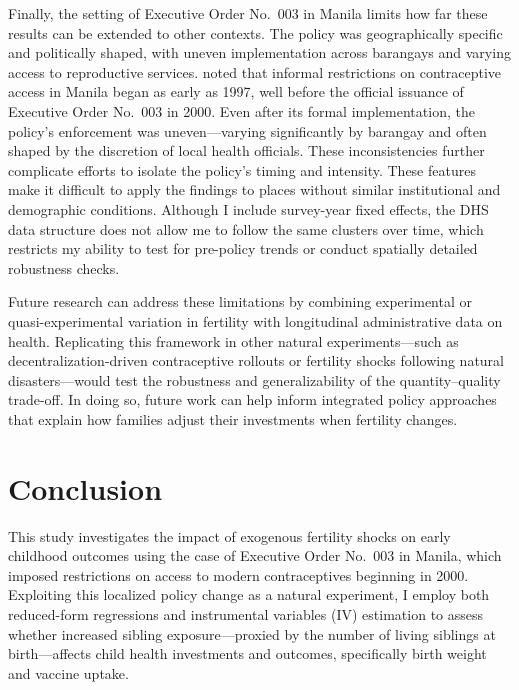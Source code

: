 \documentclass[]{AEA}
\begin{document}
Finally, the setting of Executive Order No.~003 in Manila limits how far
these results can be extended to other contexts. The policy was
geographically specific and politically shaped, with uneven
implementation across barangays and varying access to reproductive
services. \citet{dumas2019sex} noted that informal restrictions on
contraceptive access in Manila began as early as 1997, well before the
official issuance of Executive Order No.~003 in 2000. Even after its
formal implementation, the policy's enforcement was uneven---varying
significantly by barangay and often shaped by the discretion of local
health officials. These inconsistencies further complicate efforts to
isolate the policy's timing and intensity. These features make it
difficult to apply the findings to places without similar institutional
and demographic conditions. Although I include survey-year fixed
effects, the DHS data structure does not allow me to follow the same
clusters over time, which restricts my ability to test for pre-policy
trends or conduct spatially detailed robustness checks.

Future research can address these limitations by combining experimental
or quasi-experimental variation in fertility with longitudinal
administrative data on health. Replicating this framework in other
natural experiments---such as decentralization-driven contraceptive
rollouts or fertility shocks following natural disasters---would test
the robustness and generalizability of the quantity--quality trade-off.
In doing so, future work can help inform integrated policy approaches
that explain how families adjust their investments when fertility
changes.

\section{Conclusion}

This study investigates the impact of exogenous fertility shocks on
early childhood outcomes using the case of Executive Order No.~003 in
Manila, which imposed restrictions on access to modern contraceptives
beginning in 2000. Exploiting this localized policy change as a natural
experiment, I employ both reduced-form regressions and instrumental
variables (IV) estimation to assess whether increased sibling
exposure---proxied by the number of living siblings at birth---affects
child health investments and outcomes, specifically birth weight and
vaccine uptake.
\end{document}
